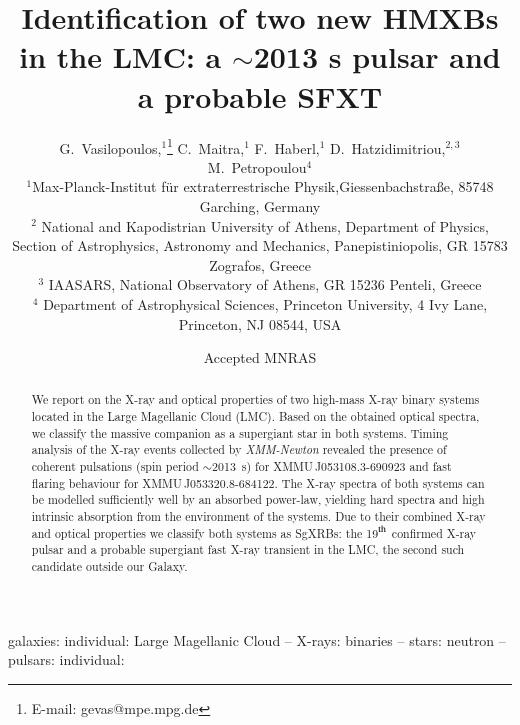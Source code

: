 \documentclass[a4paper,fleqn,usenatbib]{mnras}
\newcommand{\xmm}{{\it XMM-Newton}\xspace}
\newcommand{\canda}{XMMU\,J053108.3-690923\xspace} %
\newcommand{\candb}{XMMU\,J053320.8-684122\xspace} %
\begin{document}
\title[Two new HMXB in the LMC]{Identification of two new HMXBs in the LMC: a $\sim$2013 s pulsar and a probable SFXT}
\author[G. Vasilopoulos et al.]{G.~Vasilopoulos,$^1$\thanks{E-mail: gevas@mpe.mpg.de} C.~Maitra,$^1$ F.~Haberl,$^1$ D.~Hatzidimitriou,$^{2,3}$ M.~Petropoulou$^4$\\
$^1$Max-Planck-Institut f\"ur extraterrestrische Physik,Giessenbachstra{\ss}e, 85748 Garching, Germany \\
$^2$ National and Kapodistrian University of Athens, Department of Physics, Section of Astrophysics, Astronomy and Mechanics, Panepistiniopolis,  GR 15783 Zografos, Greece \\
$^3$  IAASARS, National Observatory of Athens, GR 15236 Penteli, Greece \\
$^4$  Department of Astrophysical Sciences, Princeton University, 4 Ivy Lane, Princeton, NJ 08544, USA
}
\date{Accepted MNRAS}

\maketitle


\begin{abstract}
We report on the X-ray and optical properties of two high-mass X-ray binary systems located in the Large Magellanic Cloud (LMC).
Based on the obtained optical spectra, we classify the massive companion as a supergiant star in both systems. 
Timing analysis of the X-ray events collected by \xmm revealed the presence of coherent pulsations (spin period $\sim$2013~s) for \canda and fast flaring behaviour for \candb.
The X-ray spectra of both systems can be modelled sufficiently well by an absorbed power-law, yielding hard spectra and high intrinsic absorption from the environment of the systems.
Due to their combined X-ray and optical properties we classify both systems as SgXRBs: the 19$^{\rm th}$ confirmed X-ray pulsar 
and a probable supergiant fast X-ray transient in the LMC, the second such candidate outside our Galaxy.
\end{abstract}

\begin{keywords}
galaxies: individual: Large Magellanic Cloud --
         X-rays: binaries --
         stars: neutron --
         pulsars: individual:
\end{keywords}
\end{document}
